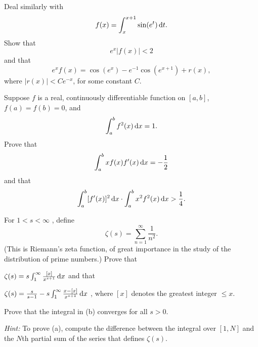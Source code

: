 \begin{myexercise}
    \label{ex:6.14}
    Deal similarly with
    \begin{equation*}
        f(x) = \int_{x}^{x+1} \sin (e^t) \d t . 
    \end{equation*}
    Show that 
    \begin{equation*}
        e^x \left| f(x) \right| < 2
    \end{equation*}
    and that 
    \begin{equation*}
        e^x f(x) = \cos (e^x) - e^{-1} \cos (e^{x+1}) + r(x),
    \end{equation*}
    where $\left| r(x) \right| < C e^{-x}$, for some constant $C$.
\end{myexercise}


\begin{myexercise}
    \label{ex:6.15}
    Suppose $f$ is a real, continuously differentiable function on $[a, b]$,$f(a) =f(b) = 0$, and
    \begin{equation*}
        \int_{a}^{b} f^2 (x) \d x = 1.
    \end{equation*}
    Prove that 
    \begin{equation*}
        \int_{a}^{b} x f(x) f'(x) \d x = -\frac{1}{2}
    \end{equation*}
    and that 
    \begin{equation*}
        \int_{a}^{b}[f'(x)]^2 \d x \cdot 
        \int_{a}^{b}x^2 f^2(x) \d x >
        \frac{1}{4} .
    \end{equation*}
\end{myexercise}


\begin{myexercise}
    \label{ex:6.16}
    For $1<s<\infty$ , define 
    \begin{equation*}
        \zeta(s) = \sum_{n=1}^{\infty} \frac{1}{n^2} .
    \end{equation*}
    (This is Riemann's zeta function, of great importance in the study of the distribution of prime numbers.) 
    Prove that
    \begin{asparaenum}[(a)]
        \item $\zeta(s) = s \int_{1}^{\infty} \frac{[x]}{x^{s+1}}\d x$ 
        and that 
        \item $\zeta(s) = \frac{s}{s-1} - s \int_{1}^{\infty} \frac{x - [x]}{x^{s+1}} \d x$ ,
        where $[x]$ denotes the greatest integer $\leq x$.
    \end{asparaenum}

    Prove that the integral in (b) converges for all $s>0$.

    \emph{Hint:} To prove (a), compute the difference between the integral over $[1,N]$ and the $N$th partial sum of the series that defines $\zeta(s)$.
\end{myexercise}


